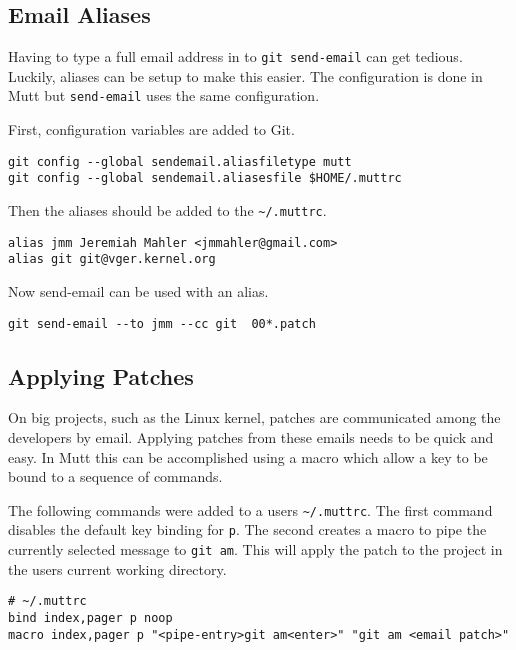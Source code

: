 \documentclass{article}
\begin{document}
\subsection{Email Aliases}
\label{sec:mutt-aliases}

Having to type a full email address in to \verb+git send-email+ can get
tedious.  Luckily, aliases can be setup to make this easier.  The
configuration is done in Mutt but \verb+send-email+ uses the same
configuration.

First, configuration variables are added to Git.

\begin{verbatim}
git config --global sendemail.aliasfiletype mutt
git config --global sendemail.aliasesfile $HOME/.muttrc
\end{verbatim}

Then the aliases should be added to the \verb+~/.muttrc+.

\begin{verbatim}
alias jmm Jeremiah Mahler <jmmahler@gmail.com>
alias git git@vger.kernel.org
\end{verbatim}

Now send-email can be used with an alias.

\begin{verbatim}
git send-email --to jmm --cc git  00*.patch
\end{verbatim}

\subsection{Applying Patches}
\label{sec:mutt-apply-patch}

On big projects, such as the Linux kernel, patches are communicated
among the developers by email.  Applying patches from these emails needs
to be quick and easy.  In Mutt this can be accomplished using a macro
which allow a key to be bound to a sequence of commands.

The following commands were added to a users \verb+~/.muttrc+.  The first
command disables the default key binding for \verb+p+.  The second creates a
macro to pipe the currently selected message to \verb+git am+.  This will
apply the patch to the project in the users current working directory.

\begin{verbatim}
# ~/.muttrc
bind index,pager p noop
macro index,pager p "<pipe-entry>git am<enter>" "git am <email patch>"
\end{verbatim}
\end{document}
